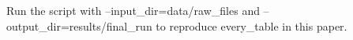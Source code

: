 \documentclass{article}
\begin{document}
Run the script with --input_dir=data/raw_files and
--output_dir=results/final_run to reproduce
every_table in this paper.
\end{document}
